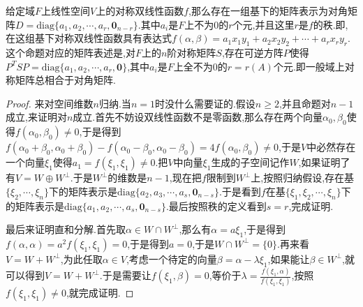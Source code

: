 给定域$F$上线性空间$V$上的对称双线性函数$f$,那么存在一组基下的矩阵表示为对角矩阵$D=\mathrm{diag}\{a_1,a_2,\cdots,a_r,\textbf{0}_{n-r}\}$.其中$a_i$是$F$上不为0的$r$个元,并且这里$r$是$f$的秩.即,在这组基下对称双线性函数具有表达式$f(\alpha,\beta)=a_1x_1y_1+a_2x_2y_2+\cdots+a_rx_ry_r$.这个命题对应的矩阵表述是,对$F$上的$n$阶对称矩阵$S$,存在可逆方阵$P$使得$P^TSP=\mathrm{diag}\{a_1,a_2,\cdots,a_r,\textbf{0}\}$,其中$a_i$是$F$上全不为0的$r=r(A)$个元.即一般域上对称矩阵总相合于对角矩阵.
\begin{proof}
	
	来对空间维数$n$归纳.当$n=1$时没什么需要证的.假设$n\ge2$,并且命题对$n-1$成立,来证明对$n$成立.首先不妨设双线性函数不是零函数,那么存在两个向量$\alpha_0,\beta_0$使得$f(\alpha_0,\beta_0)\not=0$,于是得到$f(\alpha_0+\beta_0,\alpha_0+\beta_0)-f(\alpha_0-\beta_0,\alpha_0-\beta_0)=4f(\alpha_0,\beta_0)\not=0$,于是$V$中必然存在一个向量$\xi_1$使得$a_1=f(\xi_1,\xi_1)\not=0$.把$V$中向量$\xi_1$生成的子空间记作$W$,如果证明了有$V=W\oplus W^{\perp}$.于是$W^{\perp}$的维数是$n-1$,现在把$f$限制到$W^{\perp}$上,按照归纳假设,存在基$\{\xi_2,\cdots,\xi_n\}$下的矩阵表示是$\mathrm{diag}\{a_2,a_3,\cdots,a_s,\textbf{0}_{n-s}\}$.于是看到$f$在基$\{\xi_1,\xi_2,\cdots,\xi_n\}$下的矩阵表示是$\mathrm{diag}\{a_1,a_2,\cdots,a_s,\textbf{0}_{n-s}\}$.最后按照秩的定义看到$s=r$,完成证明.
	
	最后来证明直和分解.首先取$\alpha\in W\cap W^{\perp}$,那么有$\alpha=a\xi_1$,于是得到$f(\alpha,\alpha)=a^2f(\xi_1,\xi_1)=0$,于是得到$a=0$,于是$W\cap W^{\perp}=\{0\}$.再来看$V=W+W^{\perp}$,为此任取$\alpha\in V$,考虑一个待定的向量$\beta=\alpha-\lambda\xi_1$,如果能让$\beta\in W^{\perp}$,就可以得到$V=W+W^{\perp}$.于是需要让$f(\xi_1,\beta)=0$,等价于$\lambda=\frac{f(\xi_1,\alpha)}{f(\xi_1,\xi_1)}$,按照$f(\xi_1,\xi_1)\not=0$,就完成证明.
	
\end{proof}

